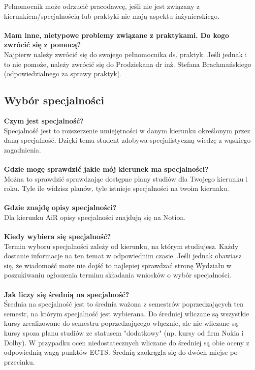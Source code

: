 \documentclass[11pt]{article}
\begin{document}
\indent Pełnomocnik może odrzucić pracodawcę, jeśli nie jest związany z kierunkiem/specjalnością lub praktyki nie mają aspektu inżynierskiego. \\\\
\textbf{Mam inne, nietypowe problemy związane z praktykami. Do kogo zwrócić się z pomocą?} \\
\indent Najpierw należy zwrócić się do swojego pełnomocnika ds. praktyk. Jeśli jednak i to nie pomoże, należy zwrócić się do Prodziekana dr inż. Stefana Brachmańskiego (odpowiedzialnego za sprawy praktyk). 
\subsection{Wybór specjalności}
\textbf{Czym jest specjalność?} \\
\indent Specjalność jest to rozszerzenie umiejętności w danym kierunku określonym przez daną specjalność. Dzięki temu student zdobywa specjalistyczną wiedzę z wąskiego zagadnienia. \\\\
\textbf{Gdzie mogę sprawdzić jakie mój kierunek ma specjalności?} \\
\indent Można to sprawdzić sprawdzając dostępne plany studiów dla Twojego kierunku i roku. Tyle ile widzisz planów, tyle istnieje specjalności na twoim kierunku. \\\\
\textbf{Gdzie znajdę opisy specjalności?} \\
\indent Dla kierunku AiR opisy specjalności znajdują się na Notion. \\\\
\textbf{Kiedy wybiera się specjalność?} \\
\indent Termin wyboru specjalności zależy od kierunku, na którym studiujesz. Każdy dostanie informacje na ten temat w odpowiednim czasie. Jeśli jednak obawiasz się, że wiadomość może nie dojść to najlepiej sprawdzać stronę Wydziału w poszukiwaniu ogłoszenia terminu składania wniosków o wybór specjalności. \\\\
\textbf{Jak liczy się średnią na specjalność?} \\
\indent Średnia na specjalność jest to średnia ważona z semestrów poprzedzających ten semestr, na którym specjalność jest wybierana. Do średniej wliczane są wszystkie kursy zrealizowane do semestru poprzedzającego włącznie, ale nie wliczane są kursy spoza planu studiów ze statusem "dodatkowy" (np. kursy od firm Nokia i Dolby). W przypadku ocen niedostatecznych wliczane do średniej są obie oceny z odpowiednią wagą punktów ECTS. Średnią zaokrągla się do dwóch miejsc po przecinku.    \\\\
\end{document}
